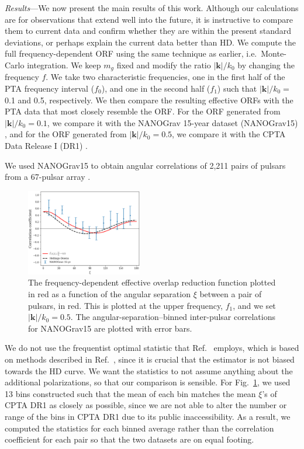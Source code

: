 \documentclass[prd,twocolumn,aps,psfig,nofootinbib,nobibnotes,superscriptaddress,preprintnumbers,times]{revtex4-2}
\begin{document}
\textit{Results}---We now present the main results of this work. Although our calculations are for observations that extend well into the future, it is instructive to compare them to current data and confirm whether they are within the present standard deviations, or perhaps explain the current data better than HD. We compute the full frequency-dependent ORF using the same technique as earlier, i.e.\ Monte-Carlo integration. We keep $m_g$ fixed and modify the ratio $|\boldsymbol{k}|/k_0$ by changing the frequency $f$. We take two characteristic frequencies, one in the first half of the PTA frequency interval ($f_0$), and one in the second half ($f_1$) such that $|\boldsymbol{k}|/k_0 =$ 0.1 and 0.5, respectively. We then compare the resulting effective ORFs with the PTA data that most closely resemble the ORF. For the ORF generated from $|\boldsymbol{k}|/k_0 = 0.1$, we compare it with the NANOGrav 15-year dataset (NANOGrav15) \cite{Agazie:2023}, and for the ORF generated from $|\boldsymbol{k}|/k_0 = 0.5$, we compare it with the CPTA Data Release I (DR1) \cite{Xu:2023wog}.

We used NANOGrav15 to obtain angular correlations of 2,211 pairs of pulsars from a 67-pulsar array \cite{Agazie:2023}. 
\begin{figure}[ht]
    \centering
    \includegraphics[width=0.45\textwidth]{fig2.pdf}
    \caption{The frequency-dependent effective overlap reduction function plotted in red as a function of the angular separation $\xi$ between a pair of pulsars, in red. This is plotted at the upper frequency, $f_1$, and we set $|\boldsymbol{k}|/k_0 = 0.5$. The angular-separation–binned inter-pulsar correlations for NANOGrav15 are plotted with error bars.}
    \label{fig:ng}
\end{figure}
We do not use the frequentist optimal statistic that Ref.~\cite{Agazie:2023} employs, which is based on methods described in Ref.~\cite{Allen:2022ksj}, since it is crucial that the estimator is not biased towards the HD curve. We want the statistics to not assume anything about the additional polarizations, so that our comparison is sensible. For Fig.~\ref{fig:ng}, we used 13 bins constructed such that the mean of each bin matches the mean $\xi$'s of CPTA DR1 as closely as possible, since we are not able to alter the number or range of the bins in CPTA DR1 due to its public inaccessibility. As a result, we computed the statistics for each binned average rather than the correlation coefficient for each pair so that the two datasets are on equal footing. 
\end{document}
